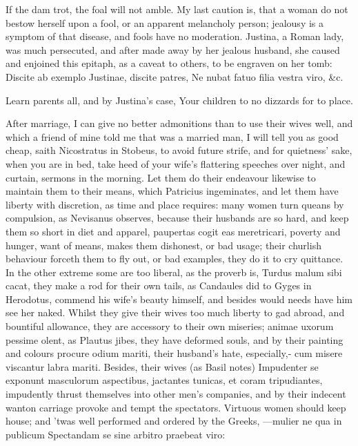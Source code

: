 {If the dam trot, the foal will not amble. My last caution is, that a
woman do not bestow herself upon a fool, or an apparent melancholy
person; jealousy is a symptom of that disease, and fools have no
moderation. Justina, a Roman lady, was much persecuted, and after made
away by her jealous husband, she caused and enjoined this epitaph, as a
caveat to others, to be engraven on her tomb:
Discite ab exemplo Justinae, discite patres,
Ne nubat fatuo filia vestra viro, \&c.

Learn parents all, and by Justina's case,
Your children to no dizzards for to place.

After marriage, I can give no better admonitions than to use their
wives well, and which a friend of mine told me that was a married man,
I will tell you as good cheap, saith Nicostratus in Stobeus, to
avoid future strife, and for quietness' sake, when you are in bed, take
heed of your wife's flattering speeches over night, and curtain,
sermons in the morning. Let them do their endeavour likewise to
maintain them to their means, which Patricius ingeminates, and
let them have liberty with discretion, as time and place requires: many
women turn queans by compulsion, as Nevisanus observes, because
their husbands are so hard, and keep them so short in diet and apparel,
paupertas cogit eas meretricari, poverty and hunger, want of means,
makes them dishonest, or bad usage; their churlish behaviour forceth
them to fly out, or bad examples, they do it to cry quittance. In the
other extreme some are too liberal, as the proverb is, Turdus malum
sibi cacat, they make a rod for their own tails, as Candaules did to
Gyges in Herodotus, commend his wife's beauty himself, and
besides would needs have him see her naked. Whilst they give their
wives too much liberty to gad abroad, and bountiful allowance, they are
accessory to their own miseries; animae uxorum pessime olent, as
Plautus jibes, they have deformed souls, and by their painting and
colours procure odium mariti, their husband's hate, especially,-
cum misere viscantur labra mariti. Besides, their wives (as Basil
notes) Impudenter se exponunt masculorum aspectibus, jactantes tunicas,
et coram tripudiantes, impudently thrust themselves into other men's
companies, and by their indecent wanton carriage provoke and tempt the
spectators. Virtuous women should keep house; and 'twas well performed
and ordered by the Greeks,
---mulier ne qua in publicum
Spectandam se sine arbitro praebeat viro:

}
